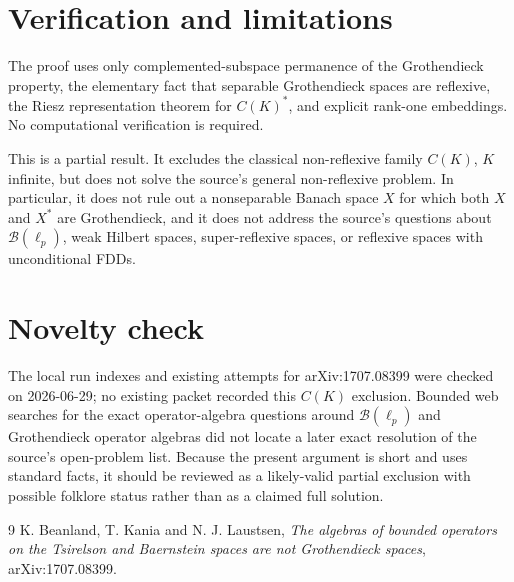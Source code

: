 \documentclass[11pt]{article}
\newcommand{\B}{\mathscr{B}}
\begin{document}
\section*{Verification and limitations}

The proof uses only complemented-subspace permanence of the Grothendieck
property, the elementary fact that separable Grothendieck spaces are
reflexive, the Riesz representation theorem for $C(K)^*$, and explicit
rank-one embeddings. No computational verification is required.

This is a partial result. It excludes the classical non-reflexive family
$C(K)$, $K$ infinite, but does not solve the source's general non-reflexive
problem. In particular, it does not rule out a nonseparable Banach space $X$
for which both $X$ and $X^*$ are Grothendieck, and it does not address the
source's questions about $\B(\ell_p)$, weak Hilbert spaces, super-reflexive
spaces, or reflexive spaces with unconditional FDDs.

\section*{Novelty check}

The local run indexes and existing attempts for arXiv:1707.08399 were checked
on 2026-06-29; no existing packet recorded this $C(K)$ exclusion. Bounded web
searches for the exact operator-algebra questions around $\B(\ell_p)$ and
Grothendieck operator algebras did not locate a later exact resolution of the
source's open-problem list. Because the present argument is short and uses
standard facts, it should be reviewed as a likely-valid partial exclusion with
possible folklore status rather than as a claimed full solution.

\begin{thebibliography}{9}
K. Beanland, T. Kania and N. J. Laustsen,
\emph{The algebras of bounded operators on the Tsirelson and Baernstein spaces
are not Grothendieck spaces}, arXiv:1707.08399.
\end{thebibliography}
\end{document}
